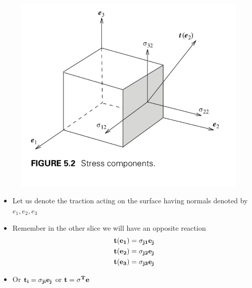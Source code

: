 	\begin{frame}
		\begin{figure}
			\centering
			\includegraphics[width=0.5\linewidth]{Figure/fig8}
		\end{figure}
	
		\begin{itemize}
			\item Let us denote the traction acting on the surface having normals denoted by $e_1, e_2,e_3$
			\item Remember in the other slice we will have an opposite reaction
			\begin{equation}
			\begin{aligned}
			\mathbf{t(e_1) = \sigma_{j1}e_j} \\\mathbf{t(e_2) = \sigma_{j2}e_j}\\\mathbf{t(e_3) = \sigma_{j3}e_j}
			\end{aligned}
			\end{equation}
			\item Or $\mathbf{t_i = \sigma_{ji}e_j}$ or $\mathbf{t = \sigma^T e}$
		\end{itemize}
	\end{frame}

